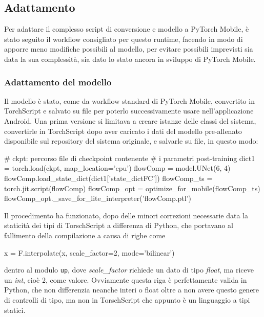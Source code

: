 \subsection{Adattamento}

Per adattare il complesso script di conversione e modello a PyTorch Mobile, è stato seguito il
workflow consigliato per questo runtime, facendo in modo di apporre meno modifiche possibili
al modello, per evitare possibili imprevisti sia data la sua complessità, sia dato lo stato 
ancora in sviluppo di PyTorch Mobile.

\subsubsection*{Adattamento del modello}
\label{sec:adattamento-modello}

Il modello è stato, come da workflow standard di PyTorch Mobile, convertito in TorchScript e 
salvato su file per poterlo successivamente usare nell'applicazione Android. Una prima versione
si limitava a creare istanze delle classi del sistema, convertirle in TorchScript dopo aver 
caricato i dati del modello pre-allenato disponibile sul repository del sistema originale, 
e salvarle su file, in questo modo:

\begin{Python}
# ckpt: percorso file di checkpoint contenente 
# i parametri post-training
dict1 = torch.load(ckpt, map_location='cpu')
flowComp = model.UNet(6, 4)
flowComp.load_state_dict(dict1['state_dictFC'])
flowComp_ts = torch.jit.script(flowComp)
flowComp_opt = optimize_for_mobile(flowComp_ts)
flowComp_opt._save_for_lite_interpreter('flowComp.ptl')
\end{Python}

Il procedimento ha funzionato, dopo delle minori correzioni necessarie data la staticità
dei tipi di TorschScript a differenza di Python, che portavano al fallimento della compilazione
a causa di righe come

\begin{Python}
x = F.interpolate(x, scale_factor=2, mode='bilinear')
\end{Python}

dentro al modulo \texttt{up}, dove \emph{scale\_factor} richiede un dato di tipo \emph{float}, 
ma riceve un \emph{int}, cioè 2, come valore. Ovviamente questa riga è perfettamente valida in 
Python, che non differenzia neanche interi o float oltre a non avere questo genere di controlli
di tipo, ma non in TorschScript che appunto è un linguaggio a tipi statici.

